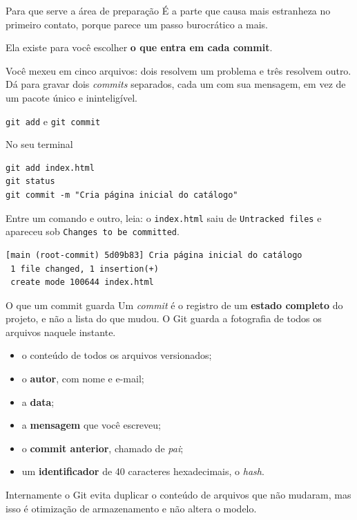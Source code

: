 \documentclass{beamer}
\newenvironment{noterminal}
  {\begin{exampleblock}{No seu terminal}}
  {\end{exampleblock}}
\begin{document}
\begin{frame}{Para que serve a área de preparação}
  É a parte que causa mais estranheza no primeiro contato, porque parece um
  passo burocrático a mais.

  \vspace{0.4cm}
  \begin{block}{}
    Ela existe para você escolher \textbf{o que entra em cada commit}.
  \end{block}

  \vspace{0.4cm}
  Você mexeu em cinco arquivos: dois resolvem um problema e três resolvem outro.
  Dá para gravar dois \textit{commits} separados, cada um com sua mensagem, em
  vez de um pacote único e ininteligível.
\end{frame}

\begin{frame}[fragile]{\texttt{git add} e \texttt{git commit}}
  \begin{noterminal}
    \begin{verbatim}
git add index.html
git status
git commit -m "Cria página inicial do catálogo"
    \end{verbatim}
  \end{noterminal}

  Entre um comando e outro, leia: o \texttt{index.html} saiu de
  \texttt{Untracked files} e apareceu sob \texttt{Changes to be committed}.

  \begin{verbatim}
[main (root-commit) 5d09b83] Cria página inicial do catálogo
 1 file changed, 1 insertion(+)
 create mode 100644 index.html
  \end{verbatim}
\end{frame}

\begin{frame}{O que um commit guarda}
  Um \textit{commit} é o registro de um \textbf{estado completo} do projeto, e
  não a lista do que mudou. O Git guarda a fotografia de todos os arquivos
  naquele instante.

  \begin{itemize}
    \item o conteúdo de todos os arquivos versionados;
    \item o \textbf{autor}, com nome e e-mail;
    \item a \textbf{data};
    \item a \textbf{mensagem} que você escreveu;
    \item o \textbf{commit anterior}, chamado de \textit{pai};
    \item um \textbf{identificador} de 40 caracteres hexadecimais, o
          \textit{hash}.
  \end{itemize}

  \vspace{0.2cm}
  \footnotesize Internamente o Git evita duplicar o conteúdo de arquivos que não
  mudaram, mas isso é otimização de armazenamento e não altera o modelo.
\end{frame}
\end{document}

